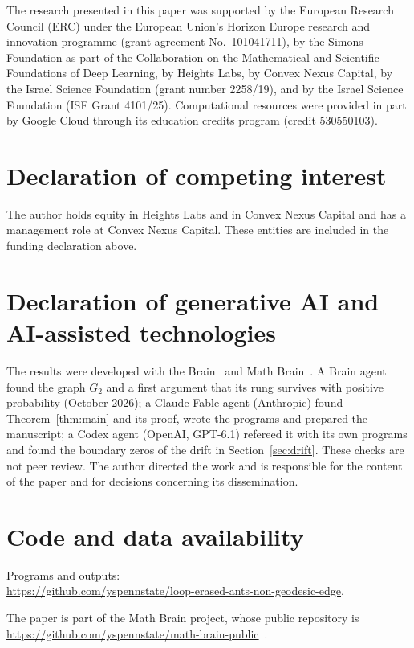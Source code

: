 \documentclass[11pt]{amsart}
\theoremstyle{remark}
\begin{document}
The research presented in this paper was supported by the European Research Council (ERC) under the European Union's
Horizon Europe research and innovation programme (grant agreement No.~101041711), by the Simons Foundation as part of
the Collaboration on the Mathematical and Scientific Foundations of Deep Learning, by Heights Labs, by Convex Nexus
Capital, by the Israel Science Foundation (grant number 2258/19), and by the Israel Science Foundation (ISF Grant
4101/25). Computational resources were provided in part by Google Cloud through its education credits program (credit
530550103).

\section*{Declaration of competing interest}
The author holds equity in Heights Labs and in Convex Nexus Capital and has a management role at Convex Nexus Capital.
These entities are included in the funding declaration above.

\section*{Declaration of generative AI and AI-assisted technologies}
The results were developed with the Brain~\cite{BrainFramework} and Math Brain~\cite{MathBrainRepo}. A Brain agent
found the graph $G_2$ and a first argument that its rung survives with positive probability (October 2026); a Claude
Fable agent (Anthropic) found Theorem~\ref{thm:main} and its proof, wrote the programs and prepared the manuscript; a
Codex agent (OpenAI, GPT-6.1) refereed it with its own programs and found the boundary zeros of the drift in
Section~\ref{sec:drift}. These checks are not peer review. The author directed the work and is responsible for the content of the paper and for
decisions concerning its dissemination.

\section*{Code and data availability}
Programs and outputs:\\
\url{https://github.com/yspennstate/loop-erased-ants-non-geodesic-edge}.

The paper is part of the Math Brain project, whose public repository is
\url{https://github.com/yspennstate/math-brain-public}~\cite{MathBrainRepo}.

\appendix

\end{document}
